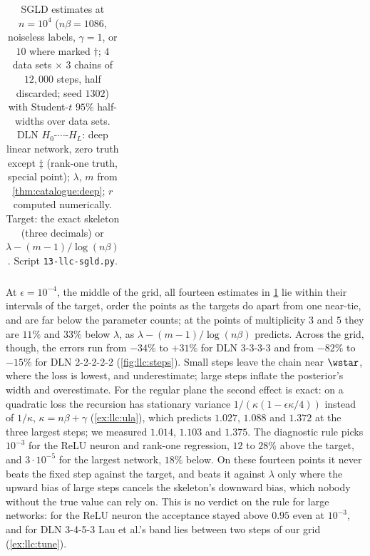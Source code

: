 \begin{refsection}
\begin{table}[t]
\begin{fullwidth}
\begin{tabular}{@{}llrrccccll@{}}
\bottomrule
\end{tabular}
\end{fullwidth}
\caption{SGLD estimates at $n=10^4$ ($n\beta=1086$, noiseless labels, $\gamma=1$, or $10$ where marked $\dagger$; $4$ data sets $\times$ $3$ chains of $12{,}000$ steps, half discarded; seed $1302$) with Student-$t$ $95\%$ half-widths over data sets. DLN $H_0$-$\cdots$-$H_L$: deep linear network, zero truth except $\ddagger$ (rank-one truth, special point); $\lambda$, $m$ from \cref{thm:catalogue:deep}; $r$ computed numerically. Target: the exact skeleton (three decimals) or $\lambda-(m-1)/\log(n\beta)$. Script \texttt{13-llc-sgld.py}.}\label{tab:llc:calib}
\end{table}

At $\epsilon=10^{-4}$, the middle of the grid, all fourteen estimates in \cref{tab:llc:calib} lie within their intervals of the target, order the points as the targets do apart from one near-tie, and are far below the parameter counts; at the points of multiplicity $3$ and $5$ they are $11\%$ and $33\%$ below $\lambda$, as $\lambda-(m-1)/\log(n\beta)$ predicts. Across the grid, though, the errors run from $-34\%$ to $+31\%$ for DLN 3-3-3-3 and from $-82\%$ to $-15\%$ for DLN 2-2-2-2-2 (\cref{fig:llc:steps}). Small steps leave the chain near $\wstar$, where the loss is lowest, and underestimate; large steps inflate the posterior's width and overestimate. For the regular plane the second effect is exact: on a quadratic loss the recursion has stationary variance $1/(\kappa(1-\epsilon\kappa/4))$ instead of $1/\kappa$, $\kappa=n\beta+\gamma$ (\cref{ex:llc:ula}), which predicts $1.027$, $1.088$ and $1.372$ at the three largest steps; we measured $1.014$, $1.103$ and $1.375$. The diagnostic rule picks $10^{-3}$ for the ReLU neuron and rank-one regression, $12$ to $28\%$ above the target, and $3\cdot10^{-5}$ for the largest network, $18\%$ below. On these fourteen points it never beats the fixed step against the target, and beats it against $\lambda$ only where the upward bias of large steps cancels the skeleton's downward bias, which nobody without the true value can rely on. This is no verdict on the rule for large networks: for the ReLU neuron the acceptance stayed above $0.95$ even at $10^{-3}$, and for DLN 3-4-5-3 Lau et al.'s band lies between two steps of our grid (\cref{ex:llc:tune}).


\end{refsection}
